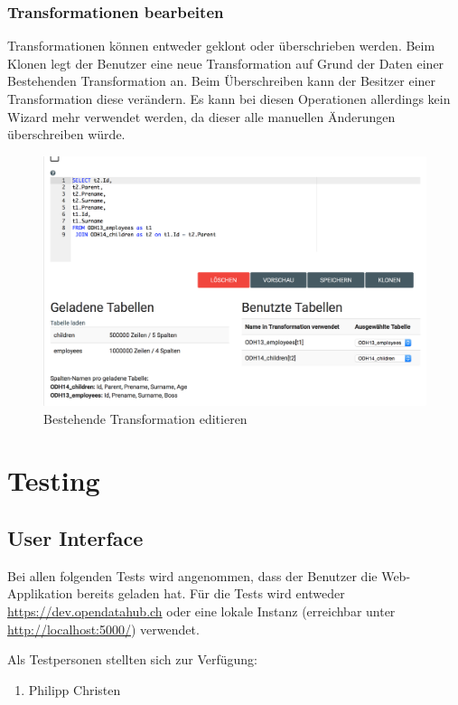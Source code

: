 \subsection{Transformationen bearbeiten}
Transformationen können entweder geklont oder überschrieben werden. Beim Klonen legt der Benutzer eine neue Transformation auf Grund der Daten einer Bestehenden Transformation an. Beim Überschreiben kann der Besitzer einer Transformation diese verändern. Es kann bei diesen Operationen allerdings kein Wizard mehr verwendet werden, da dieser alle manuellen Änderungen überschreiben würde.
\begin{figure}[H]
\centering
\includegraphics[width=\linewidth]{fig/transformation-edit.png}
\caption{Bestehende Transformation editieren}
\label{fig:pd:transformation-manual-edit}
\end{figure}

\chapter{Testing}
\section{User Interface}

Bei allen folgenden Tests wird angenommen, dass der Benutzer die Web-Applikation bereits geladen hat. Für die Tests wird entweder \url{https://dev.opendatahub.ch} oder eine lokale Instanz (erreichbar unter \url{http://localhost:5000/}) verwendet.

Als Testpersonen stellten sich zur Verfügung:
\begin{enumerate}
\item Philipp Christen
\end{enumerate}

